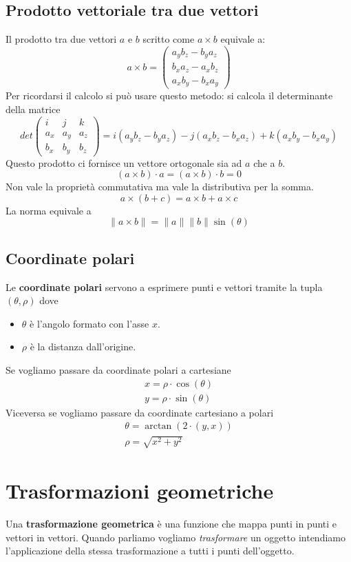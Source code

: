 \subsection{Prodotto vettoriale tra due vettori}
Il prodotto tra due vettori $a$ e $b$ scritto come $a \times b$ equivale a:
\[
	a \times b = \begin{pmatrix}
		a_y b_z - b_y a_z \\ b_x a_z - a_x b_z \\ a_x b_y - b_x a_y
	\end{pmatrix}
\]
Per ricordarsi il calcolo si pu\`o usare questo metodo: si calcola il determinante della
matrice
\[
	det \begin{pmatrix}
		i   & j   & k   \\
		a_x & a_y & a_z \\
		b_x & b_y & b_z
	\end{pmatrix} =
	i(a_y b_z - b_y a_z) - j(a_x b_z - b_x a_z) + k(a_x b_y - b_x a_y)
\]
Questo prodotto ci fornisce un vettore ortogonale sia ad $a$ che a $b$.
\[ (a \times b) \cdot a = (a \times b ) \cdot b = 0 \]
Non vale la propriet\`a commutativa ma vale la distributiva per la somma.
\[ a \times (b + c) = a \times b + a \times c \]
La norma equivale a
\[ \| a \times b \| = \| a \| \| b \| \sin(\theta) \]

\subsection{Coordinate polari}
Le \textbf{coordinate polari} servono a esprimere punti e vettori tramite la tupla
$(\theta, \rho)$ dove
\begin{itemize}
	\item $\theta$ \`e l'angolo formato con l'asse $x$.
	\item $\rho$ \`e la distanza dall'origine.
\end{itemize}
Se vogliamo passare da coordinate polari a cartesiane
\begin{gather*}
	x = \rho \cdot \cos(\theta) \\
	y = \rho \cdot \sin(\theta)
\end{gather*}
Viceversa se vogliamo passare da coordinate cartesiano a polari
\begin{gather*}
	\theta = \arctan(2 \cdot (y, x)) \\
	\rho = \sqrt{x^2 + y^2}
\end{gather*}

\section{Trasformazioni geometriche}
Una \textbf{trasformazione geometrica} \`e una funzione che mappa punti in punti e vettori
in vettori. Quando parliamo vogliamo \emph{trasformare} un oggetto intendiamo l'applicazione
della stessa trasformazione a tutti i punti dell'oggetto.

